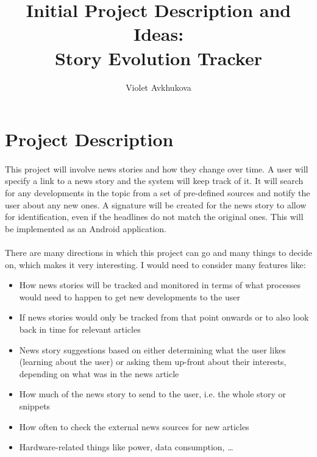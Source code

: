 \documentclass[11pt,a4paper]{article}
\begin{document}
\title{Initial Project Description and Ideas:\\Story Evolution Tracker}
\author{Violet Avkhukova}
\maketitle

\section{Project Description}
\paragraph{}
This project will involve news stories and how they change over time. A user will specify a link to a news story and the system will keep track of it. It will search for any developments in the topic from a set of pre-defined sources and notify the user about any new ones. A signature will be created for the news story to allow for identification, even if the headlines do not match the original ones. This will be implemented as an Android application.
\paragraph{}
There are many directions in which this project can go and many things to decide on, which makes it very interesting. I would need to consider many features like:
\begin{itemize}
\item How news stories will be tracked and monitored in terms of what processes would need to happen to get new developments to the user
\item If news stories would only be tracked from that point onwards or to also look back in time for relevant articles
\item News story suggestions based on either determining what the user likes (learning about the user) or asking them up-front about their interests, depending on what was in the news article
\item How much of the news story to send to the user, i.e. the whole story or snippets
\item How often to check the external news sources for new articles
\item Hardware-related things like power, data consumption, \ldots
\end{itemize}
\end{document}

